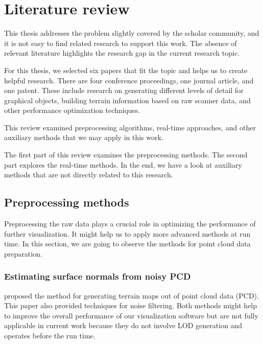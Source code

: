 \chapter{Literature review}
\label{chap:lr}


This thesis addresses the problem slightly covered by the scholar community, and it is not easy to find related research to support this work. The absence of relevant literature highlights the research gap in the current research topic.

For this thesis, we selected six papers that fit the topic and helps us to create helpful research. There are four conference proceedings, one journal article, and one patent. These include research on generating different levels of detail for graphical objects, building terrain information based on raw scanner data, and other performance optimization techniques.

This review examined preprocessing algorithms, real-time approaches, and other auxiliary methods that we may apply in this work.

The first part of this review examines the preprocessing methods. The second part explores the real-time methods. In the end, we have a look at auxiliary methods that are not directly related to this research.


\section{Preprocessing methods}

Preprocessing the raw data plays a crucial role in optimizing the performance of further visualization. It might help us to apply more advanced methods at run time. In this section, we are going to observe the methods for point cloud data preparation.

\subsection{Estimating surface normals from noisy PCD}

\textcite{Mitra2003} proposed the method for generating terrain maps out of point cloud data (PCD). This paper also provided techniques for noise filtering. Both methods might help to improve the overall performance of our visualization software but are not fully applicable in current work because they do not involve LOD generation and operates before the run time.

